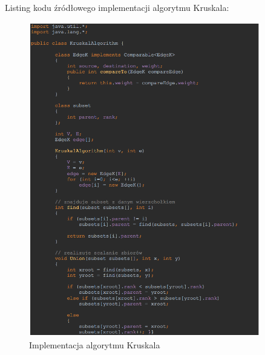 \newpage
Listing kodu źródłowego implementacji algorytmu Kruskala:\\
\begin{figure}[htb!]
	\centering
	\includegraphics[width=0.9\textwidth]{tex/fig/listing_k1}
	\caption{Implementacja algorytmu Kruskala}
	\label{fig: ik1}
\end{figure}


